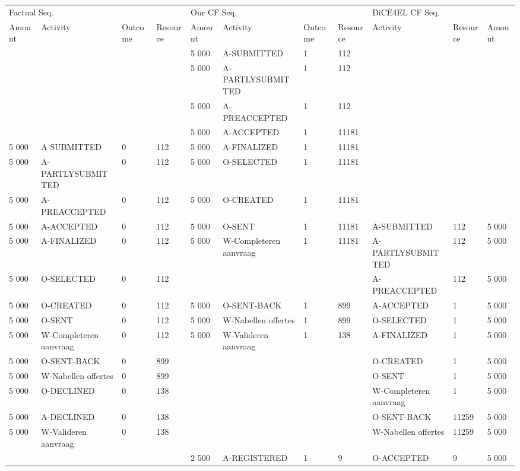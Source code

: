 \begin{tabular}{lllllllllll}
\toprule
\multicolumn{4}{l}{Factual Seq.} & \multicolumn{4}{l}{Our CF Seq.} & \multicolumn{3}{l}{DiCE4EL CF Seq.} \\
Amount & Activity & Outcome & Resource & Amount & Activity & Outcome & Resource & Activity & Resource & Amount \\
\midrule
 &  &  &  & 5 000 & A-SUBMITTED & 1 & 112 &  &  &  \\
 &  &  &  & 5 000 & A-PARTLYSUBMITTED & 1 & 112 &  &  &  \\
 &  &  &  & 5 000 & A-PREACCEPTED & 1 & 112 &  &  &  \\
 &  &  &  & 5 000 & A-ACCEPTED & 1 & 11181 &  &  &  \\
5 000 & A-SUBMITTED & 0 & 112 & 5 000 & A-FINALIZED & 1 & 11181 &  &  &  \\
5 000 & A-PARTLYSUBMITTED & 0 & 112 & 5 000 & O-SELECTED & 1 & 11181 &  &  &  \\
5 000 & A-PREACCEPTED & 0 & 112 & 5 000 & O-CREATED & 1 & 11181 &  &  &  \\
5 000 & A-ACCEPTED & 0 & 112 & 5 000 & O-SENT & 1 & 11181 & A-SUBMITTED & 112 & 5 000 \\
5 000 & A-FINALIZED & 0 & 112 & 5 000 & W-Completeren aanvraag & 1 & 11181 & A-PARTLYSUBMITTED & 112 & 5 000 \\
5 000 & O-SELECTED & 0 & 112 &  &  &  &  & A-PREACCEPTED & 112 & 5 000 \\
5 000 & O-CREATED & 0 & 112 & 5 000 & O-SENT-BACK & 1 & 899 & A-ACCEPTED & 1 & 5 000 \\
5 000 & O-SENT & 0 & 112 & 5 000 & W-Nabellen offertes & 1 & 899 & O-SELECTED & 1 & 5 000 \\
5 000 & W-Completeren aanvraag & 0 & 112 & 5 000 & W-Valideren aanvraag & 1 & 138 & A-FINALIZED & 1 & 5 000 \\
5 000 & O-SENT-BACK & 0 & 899 &  &  &  &  & O-CREATED & 1 & 5 000 \\
5 000 & W-Nabellen offertes & 0 & 899 &  &  &  &  & O-SENT & 1 & 5 000 \\
5 000 & O-DECLINED & 0 & 138 &  &  &  &  & W-Completeren aanvraag & 1 & 5 000 \\
5 000 & A-DECLINED & 0 & 138 &  &  &  &  & O-SENT-BACK & 11259 & 5 000 \\
5 000 & W-Valideren aanvraag & 0 & 138 &  &  &  &  & W-Nabellen offertes & 11259 & 5 000 \\
 &  &  &  & 2 500 & A-REGISTERED & 1 & 9 & O-ACCEPTED & 9 & 5 000 \\
\bottomrule
\end{tabular}
